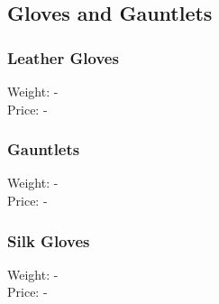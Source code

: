 \subsection{Gloves and Gauntlets}

\subsubsection{Leather Gloves}
Weight: -\\
Price: -\\

\subsubsection{Gauntlets}
Weight: -\\
Price: -\\

\subsubsection{Silk Gloves}
Weight: -\\
Price: -\\